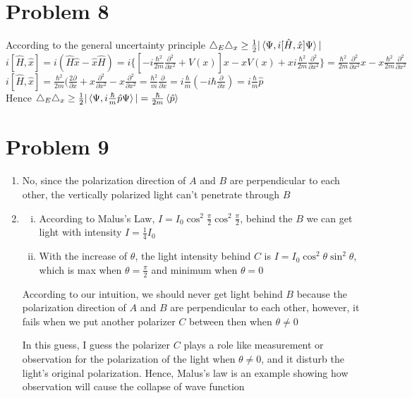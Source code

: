 \documentclass[a4paper]{article}
\begin{document}
\section{Problem 8}
\noindent According to the general uncertainty principle $\bigtriangleup_E\bigtriangleup_x\geq\frac{1}{2}|\braket{\Psi,i[\hat{H},\hat{x}]\Psi}|$
\\$i[\hat{H},\hat{x}]=i(\hat{H}\hat{x}-\hat{x}\hat{H})=i\{[-i\frac{\hbar^2}{2m}\frac{\partial^2}{\partial x^2}+V(x)]x-xV(x)+xi\frac{\hbar^2}{2m}\frac{\partial^2}{\partial x^2}\}=\frac{\hbar^2}{2m}\frac{\partial^2}{\partial x^2}x-x\frac{\hbar^2}{2m}\frac{\partial^2}{\partial x^2}$
\\$i[\hat{H},\hat{x}]=\frac{\hbar^2}{2m}(\frac{2\partial}{\partial x}+x\frac{\partial^2}{\partial x^2}-x\frac{\partial^2}{\partial x^2}=\frac{\hbar^2}{m}\frac{\partial}{\partial x}=i\frac{\hbar}{m}(-i\hbar\frac{\partial}{\partial x})=i\frac{\hbar}{m}\hat{p}$
\\Hence $\bigtriangleup_E\bigtriangleup_x\geq\frac{1}{2}|\braket{\Psi,i\frac{\hbar}{m}\hat{p}\Psi}|=\frac{\hbar}{2m}\braket{\hat{p}}$
\section{Problem 9}
\begin{enumerate}
    \item No, since the polarization direction of $A$ and $B$ are perpendicular to each other, the vertically polarized light can't penetrate through $B$
    \item \begin{enumerate}[(i)]
        \item According to Malus's Law, $I=I_0\cos^2\frac{\pi}{2}\cos^2\frac{\pi}{2}$, behind the $B$ we can get light with intensity $I=\frac{1}{4}I_0$
        \item With the increase of $\theta$, the light intensity behind $C$ is $I=I_0\cos^2\theta\sin^2\theta$, which is max when $\theta=\frac{\pi}{2}$ and minimum when $\theta=0$ 
    \end{enumerate} 
    According to our intuition, we should never get light behind $B$ because the polarization direction of $A$ and $B$ are perpendicular to each other, however, it fails when we put another polarizer $C$ between then when $\theta\neq0$
    \par In this guess, I guess the polarizer $C$ plays a role like measurement or observation for the polarization of the light when $\theta\neq0$, and it disturb the light's original polarization. Hence, Malus's law is an example showing how observation will cause the collapse of wave function    
\end{enumerate}
\end{document}
